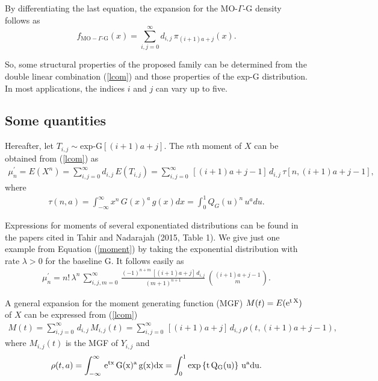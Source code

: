 \documentclass[12pt,a4paper]{article} %
\begin{document}
By differentiating the last equation, the expansion for the MO-$\Gamma$-G density follows as
\begin{equation}\label{lcom}
f_{\text{MO}-\Gamma\text{-G}}(x)=\sum_{i,j=0}^\infty d_{i,j}\,\pi_{(i+1)a+j}(x).
\end{equation}

So, some structural properties of the proposed family can be determined from the double linear combination (\ref{lcom})
and those properties of the exp-G distribution. In most applications, the indices $i$ and $j$ can vary up to five.


\subsection{Some quantities}

Hereafter, let $T_{i,j}\sim$exp-G$[(i+1)a+j]$. The $n$th moment of $X$ can be obtained from (\ref{lcom}) as
\begin{eqnarray}\label{moment}
\displaystyle
\mu_n^{\prime}=E(X^n)=\sum_{i,j=0}^\infty d_{i,j}\,E(T_{i,j})=\sum_{i,j=0}^\infty \,[(i+1)a+j-1]\,d_{i,j}\,\tau[n,(i+1)a+j-1],
\end{eqnarray}
where
\begin{eqnarray*}
\tau(n,a)=\int_{-\infty}^{\infty} x^n\,G(x)^{a}\,g(x)dx=\int_{0}^{1} Q_G(u)^n\,u^a d u.
\end{eqnarray*}

Expressions for moments of several exponentiated distributions can be found in the papers
cited in Tahir and Nadarajah (2015, Table 1). We give just one example from Equation (\ref{moment})
by taking the exponential distribution with rate $\lambda>0$ for the baseline G.
It follows easily as
\begin{eqnarray*}
\mu_n^{\prime}= n!\,\lambda^n\,\sum_{i,j,m=0}^\infty \,\frac{(-1)^{n+m}\,[(i+1)a+j]\,d_{i,j}}{(m+1)^{n+1}}\,\binom{(i+1)a+j-1}{m}.
\end{eqnarray*}

A general expansion for the moment generating function (MGF) $M(t)=E(\rm{e}^{t\,X})$ of $X$ can be expressed from (\ref{lcom})
\begin{eqnarray}\label{mgf}
\displaystyle
M(t)=\sum_{i,j=0}^{\infty} \,d_{i,j}\,M_{i,j}(t)=\sum_{i,j=0}^{\infty}\, [(i+1)a+j]\,d_{i,j}\,\rho(t,(i+1)a+j-1),
\end{eqnarray}
where $M_{i,j}(t)$ is the MGF of $Y_{i,j}$ and
\begin{eqnarray*}
\rho(t,a)=\int_{-\infty}^{\infty}\,\rm{e}^{t x}\,G(x)^{a}\,g(x) dx=\int_{0}^{1}\exp\left\{t\,Q_G(u)\right\}\,u^a d u.
\end{eqnarray*}
\end{document}
